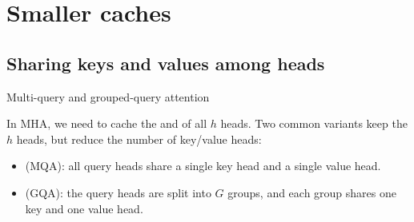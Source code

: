 \documentclass[11pt,aspectratio=169]{beamer}
\begin{document}
\section{Smaller caches}
\subsection{Sharing keys and values among heads}

\begin{frame}{Multi-query and grouped-query attention}
    \setlength{\parskip}{6pt}

    In MHA, we need to cache the  and  of all $h$ heads.
    Two common variants keep the $h$  heads, but reduce the number
    of key/value heads:
    \begin{itemize}
        \setlength{\itemsep}{3pt}
        \item {} (MQA): all query heads share a
              single key head and a single value head.
        \item {} (GQA): the query heads are
              split into $G$ groups, and each group shares one key and one value
              head.
    \end{itemize}

    \vspace{0.3em}
    \centering
    


\end{frame}
\end{document}
